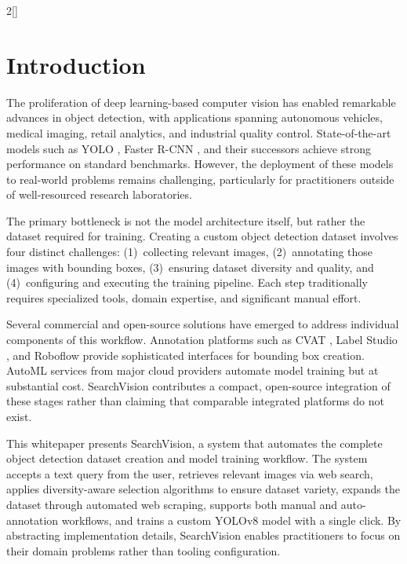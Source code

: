 \documentclass[12pt, letterpaper]{article}
\let\origtableofcontents\tableofcontents
\renewcommand{\tableofcontents}{%
  \begin{multicols}{2}[\origtableofcontents]
  \end{multicols}%
}
\begin{document}
\tableofcontents
\clearpage


\section{Introduction}

The proliferation of deep learning-based computer vision has enabled remarkable advances
in object detection, with applications spanning autonomous vehicles, medical imaging,
retail analytics, and industrial quality control. State-of-the-art models such as YOLO
\cite{redmon2018yolov3}, Faster R-CNN \cite{ren2015faster}, and their successors achieve
strong performance on standard benchmarks. However, the deployment of these models to
real-world problems remains challenging, particularly for practitioners outside of
well-resourced research laboratories.

The primary bottleneck is not the model architecture itself, but rather the dataset required
for training. Creating a custom object detection dataset involves four distinct challenges:
(1)~collecting relevant images, (2)~annotating those images with bounding boxes,
(3)~ensuring dataset diversity and quality, and (4)~configuring and executing the training
pipeline. Each step traditionally requires specialized tools, domain expertise, and
significant manual effort.

Several commercial and open-source solutions have emerged to address individual components
of this workflow. Annotation platforms such as CVAT \cite{cvat}, Label Studio
\cite{labelstudio}, and Roboflow \cite{roboflow} provide sophisticated interfaces for
bounding box creation. AutoML services from major cloud providers automate model training
but at substantial cost. SearchVision contributes a compact, open-source integration of
these stages rather than claiming that comparable integrated platforms do not exist.

This whitepaper presents SearchVision, a system that automates the complete object detection
dataset creation and model training workflow. The system accepts a text query from the user,
retrieves relevant images via web search, applies diversity-aware selection algorithms to
ensure dataset variety, expands the dataset through automated web scraping, supports both
manual and auto-annotation workflows, and trains a custom YOLOv8 model \cite{yolov8} with a
single click. By abstracting implementation details, SearchVision enables practitioners to
focus on their domain problems rather than tooling configuration.
\end{document}
